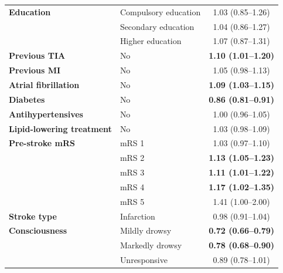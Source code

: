 \begin{table}[htbp]
\begin{threeparttable}
\begin{tabularx}{\textwidth}{@{}XXc@{}}
      \addlinespace
      \textbf{Education}
       & Compulsory education     & 1.03 (0.85--1.26)          \\
       & Secondary education      & 1.04 (0.86--1.27)          \\
       & Higher education         & 1.07 (0.87--1.31)          \\

      \addlinespace
      \textbf{Previous TIA}
       & No                       & \textbf{1.10 (1.01--1.20)} \\
      \addlinespace
      \textbf{Previous MI}
       & No                       & 1.05 (0.98--1.13)          \\

      \addlinespace
      \textbf{Atrial fibrillation}
       & No                       & \textbf{1.09 (1.03--1.15)} \\
      \addlinespace
      \textbf{Diabetes}
       & No                       & \textbf{0.86 (0.81--0.91)} \\
      \addlinespace
      \textbf{Antihypertensives}
       & No                       & 1.00 (0.96--1.05)          \\

      \addlinespace
      \textbf{Lipid-lowering treatment}
       & No                       & 1.03 (0.98--1.09)          \\

      \addlinespace
      \textbf{Pre-stroke mRS}
       & mRS 1                    & 1.03 (0.97--1.10)          \\
       & mRS 2                    & \textbf{1.13 (1.05--1.23)} \\
       & mRS 3                    & \textbf{1.11 (1.01--1.22)} \\
       & mRS 4                    & \textbf{1.17 (1.02--1.35)} \\
       & mRS 5                    & 1.41 (1.00--2.00)          \\

      \addlinespace
      \textbf{Stroke type}
       & Infarction               & 0.98 (0.91--1.04)          \\

      \addlinespace
      \textbf{Consciousness}
       & Mildly drowsy            & \textbf{0.72 (0.66--0.79)} \\
       & Markedly drowsy          & \textbf{0.78 (0.68--0.90)} \\
       & Unresponsive             & 0.89 (0.78--1.01)          \\


\end{tabularx}
\end{threeparttable}
\end{table}
